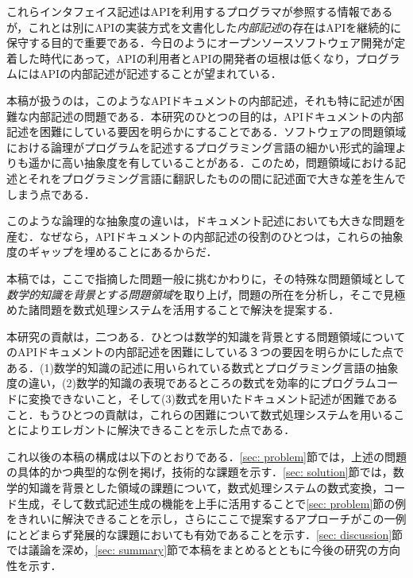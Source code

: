 これらインタフェイス記述はAPIを利用するプログラマが参照する情報であるが，これとは別にAPIの実装方式を文書化した\emph {内部記述}の存在はAPIを継続的に保守する目的で重要である．今日のようにオープンソースソフトウェア開発が定着した時代にあって，APIの利用者とAPIの開発者の垣根は低くなり，プログラムにはAPIの内部記述が記述することが望まれている．

本稿が扱うのは，このようなAPIドキュメントの内部記述，それも特に記述が困難な内部記述の問題である．本研究のひとつの目的は，APIドキュメントの内部記述を困難にしている要因を明らかにすることである．ソフトウェアの問題領域における論理がプログラムを記述するプログラミング言語の細かい形式的論理よりも遥かに高い抽象度を有していることがある．このため，問題領域における記述とそれをプログラミング言語に翻訳したものの間に記述面で大きな差を生んでしまう点である．

このような論理的な抽象度の違いは，ドキュメント記述においても大きな問題を産む．なぜなら，APIドキュメントの内部記述の役割のひとつは，これらの抽象度のギャップを埋めることにあるからだ．

本稿では，ここで指摘した問題一般に挑むかわりに，その特殊な問題領域として\emph {数学的知識を背景とする問題領域}を取り上げ，問題の所在を分析し，そこで見極めた諸問題を数式処理システムを活用することで解決を提案する．

本研究の貢献は，二つある．ひとつは数学的知識を背景とする問題領域についてのAPIドキュメントの内部記述を困難にしている３つの要因を明らかにした点である．(1)数学的知識の記述に用いられている数式とプログラミング言語の抽象度の違い，(2)数学的知識の表現であるところの数式を効率的にプログラムコードに変換できないこと，そして(3)数式を用いたドキュメント記述が困難であること．もうひとつの貢献は，これらの困難について数式処理システムを用いることによりエレガントに解決できることを示した点である．

これ以後の本稿の構成は以下のとおりである．\ref {sec: problem}節では，上述の問題の具体的かつ典型的な例を掲げ，技術的な課題を示す．\ref {sec: solution}節では，数学的知識を背景とした領域の課題について，数式処理システムの数式変換，コード生成，そして数式記述生成の機能を上手に活用することで\ref {sec: problem}節の例をきれいに解決できることを示し，さらにここで提案するアプローチがこの一例にとどまらず発展的な課題においても有効であることを示す．\ref {sec: discussion}節では議論を深め，\ref {sec: summary}節で本稿をまとめるとともに今後の研究の方向性を示す．

